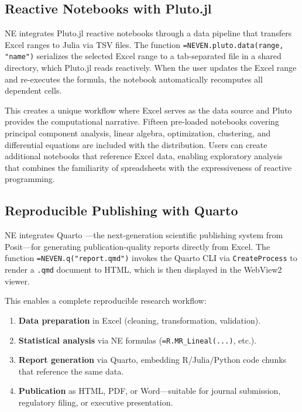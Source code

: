 \documentclass[preprint,12pt,authoryear]{elsarticle}
\newcommand{\neven}{NE\raisebox{0.2ex}{v}\rotatebox[origin=c]{180}{E}\rotatebox[origin=c]{180}{N}}
\begin{document}
\subsection{Reactive Notebooks with Pluto.jl}

\neven{} integrates Pluto.jl \citep{Pluto2023} reactive notebooks through a data pipeline that transfers Excel ranges to Julia via TSV files. The function \texttt{=NEVEN.pluto.data(range, "name")} serializes the selected Excel range to a tab-separated file in a shared directory, which Pluto.jl reads reactively. When the user updates the Excel range and re-executes the formula, the notebook automatically recomputes all dependent cells.

This creates a unique workflow where Excel serves as the data source and Pluto provides the computational narrative. Fifteen pre-loaded notebooks covering principal component analysis, linear algebra, optimization, clustering, and differential equations are included with the distribution. Users can create additional notebooks that reference Excel data, enabling exploratory analysis that combines the familiarity of spreadsheets with the expressiveness of reactive programming.

\subsection{Reproducible Publishing with Quarto}
\label{subsec:quarto}

\neven{} integrates Quarto \citep{Quarto2023}---the next-generation scientific publishing system from Posit---for generating publication-quality reports directly from Excel. The function \texttt{=NEVEN.q("report.qmd")} invokes the Quarto CLI via \texttt{CreateProcess} to render a \texttt{.qmd} document to HTML, which is then displayed in the WebView2 viewer.

This enables a complete reproducible research workflow:
\begin{enumerate}
    \item \textbf{Data preparation} in Excel (cleaning, transformation, validation).
    \item \textbf{Statistical analysis} via \neven{} formulas (\texttt{=R.MR\_Lineal(...)}, etc.).
    \item \textbf{Report generation} via Quarto, embedding R/Julia/Python code chunks that reference the same data.
    \item \textbf{Publication} as HTML, PDF, or Word---suitable for journal submission, regulatory filing, or executive presentation.
\end{enumerate}
\end{document}
